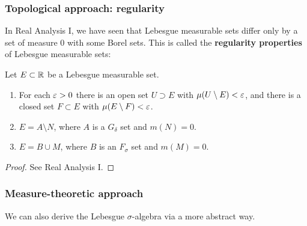 \subsubsection*{Topological approach: regularity}
In Real Analysis I, we have seen that Lebesgue measurable sets differ only by a set of measure $0$ with some Borel sets. This is called the \textbf{regularity properties} of Lebesgue measurable sets:
\begin{proposition}
    Let $E \subset \mathbb{R}$ be a Lebesgue measurable set. 
    \begin{enumerate}
    \item For each $\varepsilon>0$ there is an open set $U \supset E$ with $\mu(U \setminus E) < \varepsilon$, and there is a closed set $F \subset E$ with $\mu(E \setminus F) < \varepsilon$. 
    \item $E = A \setminus N$, where $A$ is a $G_\delta$ set and $m(N)=0$. 
    \item $E = B \cup M$, where $B$ is an $F_\sigma$ set and $m(M) = 0$. 
    \end{enumerate}
\end{proposition}
\begin{proof}
    See Real Analysis I. 
\end{proof}



\subsubsection*{Measure-theoretic approach}
We can also derive the Lebesgue $\sigma$-algebra via a more abstract way. 

